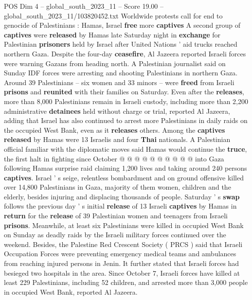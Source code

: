 \begin{textsample}{POS Dim 4 – global\_south\_2023\_11 – Score 19.00 – global\_south\_2023\_11/103820452.txt}  \label{ex:f4_pos_168}
Worldwide protests call for end to genocide of Palestinians : Hamas, Israel \textbf{free} more \textbf{captives} A second group of \textbf{captives} were \textbf{released} by Hamas late Saturday night in \textbf{exchange} for Palestinian \textbf{prisoners} held by Israel after United Nations ' aid trucks reached northern Gaza.
Despite the four-day \textbf{ceasefire}, Al Jazeera reported Israeli forces were warning Gazans from heading north.
A Palestinian journalist said on Sunday IDF forces were arresting and shooting Palestinians in northern Gaza.
Around 39 Palestinians -- six women and 33 minors -- were \textbf{freed} from Israeli \textbf{prisons} and \textbf{reunited} with their families on Saturday.
Even after the \textbf{releases}, more than 8,000 Palestinians remain in Israeli custody, including more than 2,200 administrative \textbf{detainees} held without charge or trial, reported Al Jazeera, adding that Israel has also continued to arrest more Palestinians in daily raids on the occupied West Bank, even as it \textbf{releases} others.
Among the \textbf{captives} \textbf{released} by Hamas were 13 Israelis and four \textbf{Thai} nationals.
A Palestinian official familiar with the diplomatic moves said Hamas would continue the \textbf{truce}, the first halt in fighting since October @ @ @ @ @ @ @ @ @ @ into Gaza following Hamas surprise raid claiming 1,200 lives and taking around 240 persons \textbf{captives}.
Israel ' s seige, relentless bombardment and on ground offensive killed over 14,800 Palestinians in Gaza, majority of them women, children and the elderly, besides injuring and displacing thousands of people.
Saturday ' s \textbf{swap} follows the previous day ' s initial \textbf{release} of 13 Israeli \textbf{captives} by Hamas in \textbf{return} for the \textbf{release} of 39 Palestinian women and teenagers from Israeli \textbf{prisons}.
Meanwhile, at least six Palestinians were killed in occupied West Bank on Sunday as deadly raids by the Israeli military forces continued over the weekend.
Besides, the Palestine Red Crescent Society ( PRCS ) said that Israeli Occupation Forces were preventing emergency medical teams and ambulances from reaching injured persons in Jenin.
It further stated that Israeli forces had besieged two hospitals in the area.
Since October 7, Israeli forces have killed at least 229 Palestinians, including 52 children, and arrested more than 3,000 people in occupied West Bank, reported Al Jazeera.

\end{textsample}
